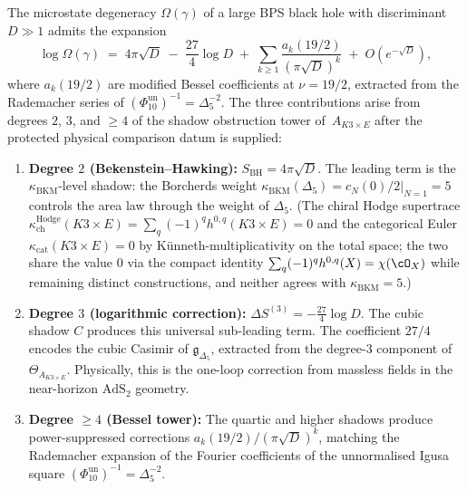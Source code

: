 \begin{theorem}
\label{thm:phys-bps-entropy-degrees}
The microstate degeneracy $\Omega(\gamma)$ of a large BPS black hole with discriminant $D \gg 1$ admits the expansion
\begin{equation}\label{eq:phys-bps-entropy-full}
\log \Omega(\gamma) \;=\;
4\pi\sqrt{D} \;-\; \frac{27}{4}\log D
\;+\; \sum_{k \geq 1} \frac{a_k(19/2)}{(\pi\sqrt{D})^k}
\;+\; O(e^{-\sqrt{D}}),
\end{equation}
where \(a_k(19/2)\) are modified Bessel coefficients at \(\nu = 19/2\), extracted from the Rademacher series of \((\Phi_{10}^{\mathrm{un}})^{-1}=\Delta_5^{-2}\). The three contributions arise from degrees \(2\), \(3\), and \(\geq 4\) of the shadow obstruction tower of~\(A_{K3 \times E}\) after the protected physical comparison datum is supplied:
\begin{enumerate}[label=\textup{(\roman*)}]
\item \textbf{Degree $2$ (Bekenstein--Hawking):} $S_{\mathrm{BH}} = 4\pi\sqrt{D}$.
The leading term is the $\kappa_{\mathrm{BKM}}$-level shadow: the Borcherds weight $\kappa_{\mathrm{BKM}}(\Delta_5) = \left.c_N(0)/2\right|_{N=1} = 5$ controls the area law through the weight of $\Delta_5$. (The chiral Hodge supertrace $\kappa_{\mathrm{ch}}^{\mathrm{Hodge}}(K3\times E) = \sum_q (-1)^q h^{0, q}(K3 \times E) = 0$ and the categorical Euler $\kappa_{\mathrm{cat}}(K3\times E) = 0$ by K\"unneth-multiplicativity on the total space; the two share the value $0$ via the compact identity $\sum_q (-1)^q h^{0, q}(X) = \chi(\cO_X)$ while remaining distinct constructions, and neither agrees with $\kappa_{\mathrm{BKM}} = 5$.)
\item \textbf{Degree $3$ (logarithmic correction):} $\Delta S^{(3)} = -\tfrac{27}{4}\log D$.
The cubic shadow $C$ produces this universal sub-leading term. The coefficient $27/4$ encodes the cubic Casimir of $\mathfrak{g}_{\Delta_5}$, extracted from the degree-3 component of $\Theta_{A_{K3\times E}}$. Physically, this is the one-loop correction from massless fields in the near-horizon $\mathrm{AdS}_2$ geometry.
\item \textbf{Degree $\geq 4$ (Bessel tower):} The quartic and higher shadows produce power-suppressed corrections \(a_k(19/2)/(\pi\sqrt{D})^k\), matching the Rademacher expansion of the Fourier coefficients of the unnormalised Igusa square \((\Phi_{10}^{\mathrm{un}})^{-1}=\Delta_5^{-2}\).
\end{enumerate}
\end{theorem}

